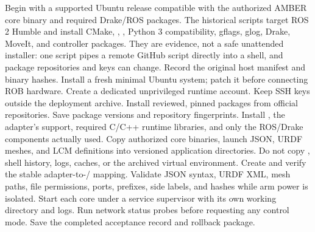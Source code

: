\markdownRendererInterblockSeparator
{}Begin with a supported Ubuntu release compatible with the authorized AMBER core binary and required Drake/ROS packages. The historical scripts target ROS 2 Humble and install CMake, , , Python 3 compatibility, gflags, glog, Drake, MoveIt, and controller packages. They are evidence, not a safe unattended installer: one script pipes a remote GitHub script directly into a shell, and package repositories and keys can change.\markdownRendererInterblockSeparator
{}\markdownRendererSectionBegin
{}\markdownRendererInterblockSeparator
{}\markdownRendererOlBegin
{}Record the original host manifest and binary hashes.\markdownRendererOlItemEnd 
{}Install a fresh minimal Ubuntu system; patch it before connecting ROB hardware.\markdownRendererOlItemEnd 
{}Create a dedicated unprivileged runtime account. Keep SSH keys outside the deployment archive.\markdownRendererOlItemEnd 
{}Install reviewed, pinned packages from official repositories. Save package versions and repository fingerprints.\markdownRendererOlItemEnd 
{}Install , the adapter's  support, required C/C++ runtime libraries, and only the ROS/Drake components actually used.\markdownRendererOlItemEnd 
{}Copy authorized core binaries, launch JSON, URDF meshes, and LCM definitions into versioned application directories. Do not copy , shell history, logs, caches, or the archived virtual environment.\markdownRendererOlItemEnd 
{}Create and verify the stable adapter-to-/ mapping.\markdownRendererOlItemEnd 
{}Validate JSON syntax, URDF XML, mesh paths, file permissions, ports, prefixes, side labels, and hashes while arm power is isolated.\markdownRendererOlItemEnd 
{}Start each core under a service supervisor with its own working directory and logs.\markdownRendererOlItemEnd 
{}Run network status probes before requesting any control mode.\markdownRendererOlItemEnd 
{}Save the completed acceptance record and rollback package.\markdownRendererOlItemEnd 
